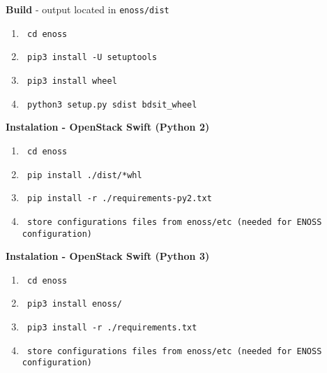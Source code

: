 \textbf{Build} - output located in \texttt{enoss/dist}
\begin{enumerate}
    \item \begin{verbatim} cd enoss\end{verbatim}
    \item \begin{verbatim} pip3 install -U setuptools\end{verbatim}
    \item \begin{verbatim} pip3 install wheel\end{verbatim}
    \item \begin{verbatim} python3 setup.py sdist bdsit_wheel\end{verbatim}
\end{enumerate}

\textbf{Instalation - OpenStack Swift (Python 2)}
\begin{enumerate}
    \item \begin{verbatim} cd enoss \end{verbatim}
    \item \begin{verbatim} pip install ./dist/*whl\end{verbatim}
    \item \begin{verbatim} pip install -r ./requirements-py2.txt\end{verbatim}
    \item \begin{verbatim} store configurations files from enoss/etc (needed for ENOSS configuration)\end{verbatim}
\end{enumerate}

\textbf{Instalation - OpenStack Swift (Python 3)}
\begin{enumerate}
    \item \begin{verbatim} cd enoss \end{verbatim}
    \item \begin{verbatim} pip3 install enoss/\end{verbatim}
    \item \begin{verbatim} pip3 install -r ./requirements.txt\end{verbatim}
    \item \begin{verbatim} store configurations files from enoss/etc (needed for ENOSS configuration)\end{verbatim}
\end{enumerate}

